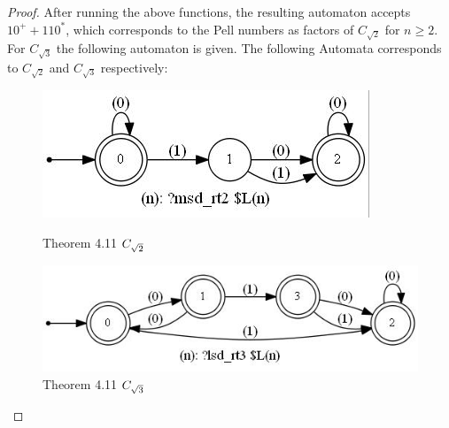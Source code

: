 \begin{proof}
After running the above functions, the resulting automaton accepts $10^{+}+110^{*}$, which corresponds to the Pell numbers as factors of $C_{\sqrt{2}}$ for $n\geq2$. For $C_{\sqrt{3}}$ the following automaton is given. The following Automata corresponds to $C_{\sqrt{2}}$ and $C_{\sqrt{3}}$ respectively:  

\begin{figure}[h!]
\vspace{10mm}
	\begin{minipage}{0.45\textwidth}
      \centering
      \includegraphics[width=\linewidth]{sturmian_word_paper/paper_images/rt2Theorem19.jpg}
      \caption{Theorem 4.11 $C_{\sqrt{2}}$}
      \centering

  	\end{minipage}%
    \hspace{0.05\textwidth}
    \begin{minipage}{0.45\textwidth}
      \centering
      \includegraphics[width=\linewidth]{sturmian_word_paper/paper_images/rt3Theorem19.jpg}
      \caption{Theorem 4.11 $C_{\sqrt{3}}$}
      \centering

    \end{minipage}
\end{figure}
\end{proof} 

